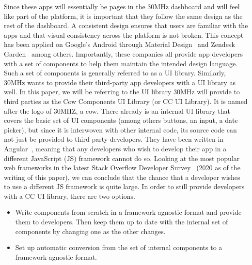 Since these apps will essentially be pages in the 30MHz dashboard and will feel like part of the platform, it is important that they follow the same design as the rest of the dashboard. A consistent design ensures that users are familiar with the apps and that visual consistency across the platform is not broken. This concept has been applied on Google's Android through Material Design~ and Zendesk Garden~ among others. Importantly, these companies all provide app developers with a set of components to help them maintain the intended design language. Such a set of components is generally referred to as a UI library.
Similarly, 30MHz wants to provide their third-party app developers with a UI library as well. In this paper, we will be referring to the UI library 30MHz will provide to third parties as the Cow Components UI Library (or CC UI Library). It is named after the logo of 30MHZ, a cow. There already is an internal UI library that covers the basic set of UI components (among others buttons, an input, a date picker), but since it is interwoven with other internal code, its source code can not just be provided to third-party developers. They have been written in Angular~, meaning that any developers who wish to develop their app in a different JavaScript (JS) framework cannot do so. Looking at the most popular web frameworks in the latest Stack Overflow Developer Survey~ (2020 as of the writing of this paper), we can conclude that the chance that a developer wishes to use a different JS framework is quite large. In order to still provide developers with a CC UI library, there are two options.

\begin{itemize}
  \item Write components from scratch in a framework-agnostic format and provide them to developers. Then keep them up to date with the internal set of components by changing one as the other changes.
  \item Set up automatic conversion from the set of internal components to a framework-agnostic format.
\end{itemize}

